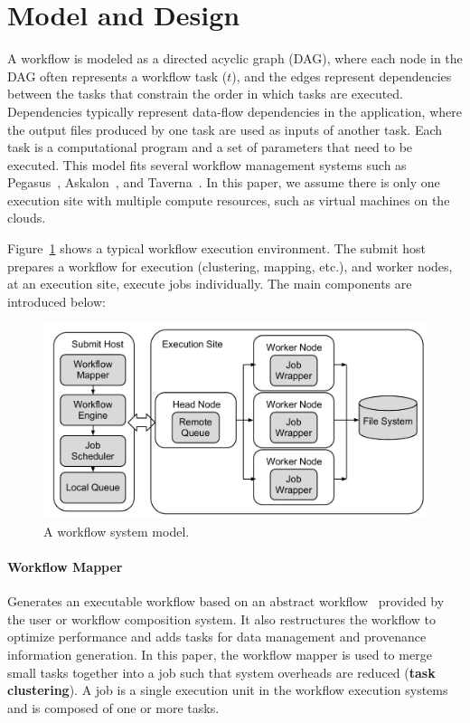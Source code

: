 \section{Model and Design}
\label{sec:model}


A workflow is modeled as a directed acyclic graph (DAG), where each node in the DAG often represents a workflow task ($t$), and the edges represent dependencies between the tasks that constrain the order in which tasks are executed. Dependencies typically represent data-flow dependencies in the application, where the output files produced by one task are used as inputs of another task. Each task is a computational program and a set of parameters that need to be executed. 
This model fits several workflow management systems such as Pegasus~\cite{Deelman:2005:PFM:1239649.1239653}, Askalon~\cite{Fahringer:2005:ATS:1064323.1064331}, and Taverna~\cite{Oinn:2006:TLC:1148437.1148448}. In this paper, we assume there is only one execution site with multiple compute resources, such as virtual machines on the clouds. 


Figure~\ref{fig:model_system} shows a typical workflow execution environment. The submit host prepares a workflow for execution (clustering, mapping, etc.), and worker nodes, at an execution site, execute jobs individually. The main components are introduced below:

\begin{figure}[!htb]
\centering
  \includegraphics[width=0.95\linewidth]{figure1.pdf}
  \caption{A workflow system model.}
  \label{fig:model_system}
\end{figure}

\paragraph{Workflow Mapper} Generates an executable workflow based on an abstract workflow~\cite{Deelman2004} provided by the user or workflow composition system. It also restructures the workflow to optimize performance and adds tasks for data management and provenance information generation. In this paper, the workflow mapper is used to merge small tasks together into a job such that system overheads are reduced (\textbf{task clustering}). A job is a single execution unit in the workflow execution systems and is composed of one or more tasks. 


